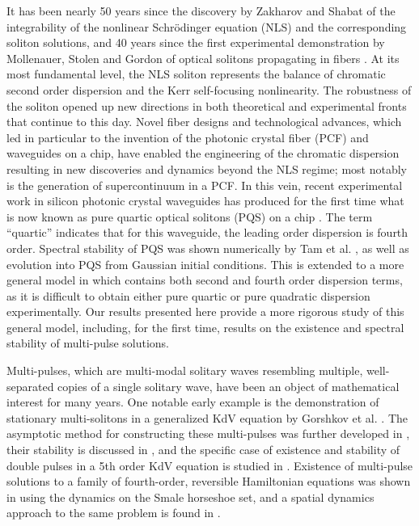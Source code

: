 \documentclass[12pt]{elsarticle}
\begin{document}
It has been nearly 50 years since the discovery by Zakharov and Shabat \cite{Zak72} of the integrability of the nonlinear Schr\"odinger equation (NLS) and the corresponding soliton solutions, and 40 years since the first experimental demonstration by Mollenauer, Stolen and Gordon of optical solitons propagating in fibers \cite{Moll80}. At its most fundamental level, the NLS soliton represents the balance of chromatic second order dispersion and the Kerr self-focusing nonlinearity. The robustness of the soliton opened up new directions in both theoretical and experimental fronts that continue to this day. Novel fiber designs and technological advances, which led in particular to the invention of the photonic crystal fiber (PCF) and waveguides on a chip, have enabled the engineering of the chromatic dispersion resulting in new discoveries and dynamics beyond the NLS regime; most notably is the generation of supercontinuum in a PCF. In this vein, recent experimental work in silicon photonic crystal waveguides has produced for the first time what is now known as pure quartic optical solitons (PQS) on a chip \cite{BlancoPQS}. The term ``quartic'' indicates that for this waveguide, the leading order dispersion is fourth order. Spectral stability of PQS was shown numerically by Tam et al. \cite{Tam2019}, as well as evolution into PQS from Gaussian initial conditions. This is extended to a more general model in \cite{Tam2020} which contains both second and fourth order dispersion terms, as it is difficult to obtain either pure quartic or pure quadratic dispersion experimentally. Our results presented here provide a more rigorous study of this general model, including, for the first time, results on the existence and spectral stability of multi-pulse solutions.

Multi-pulses, which are multi-modal solitary waves resembling multiple, well-separated copies of a single solitary wave, have been an object of mathematical interest for many years. One notable early example is the demonstration of stationary multi-solitons in a generalized KdV equation by Gorshkov et al. \cite{Gorshkov1979}. The asymptotic method for constructing these multi-pulses was further developed in \cite{Gorskkov1981}, their stability is discussed in \cite{Buryak1997}, and the specific case of existence and stability of double pulses in a 5th order KdV equation is studied in \cite{Pelinovsky2007}. Existence of multi-pulse solutions to a family of fourth-order, reversible Hamiltonian equations was shown in \cite{Buffoni1996} using the dynamics on the Smale horseshoe set, and a spatial dynamics approach to the same problem is found in \cite{SandstedeStrut}.
\end{document}
